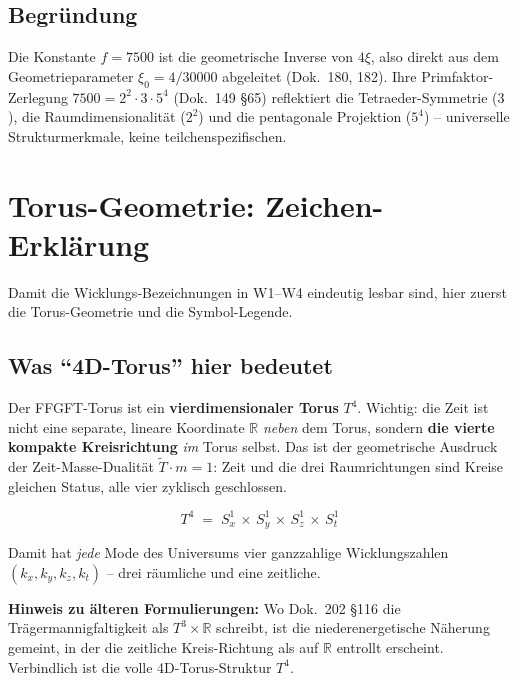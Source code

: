 \subsection*{Begründung}

Die Konstante $f = 7500$ ist die geometrische Inverse von $4\xi$,
also direkt aus dem Geometrieparameter $\xi_0 = 4/30000$ abgeleitet
(Dok.~180, 182). Ihre Primfaktor-Zerlegung
$7500 = 2^2 \cdot 3 \cdot 5^4$ (Dok.~149 §65) reflektiert die
Tetraeder-Symmetrie ($3$), die Raumdimensionalität ($2^2$) und die
pentagonale Projektion ($5^4$) -- universelle Strukturmerkmale, keine
teilchenspezifischen.

\section{Torus-Geometrie: Zeichen-Erklärung}

Damit die Wicklungs-Bezeichnungen in W1--W4 eindeutig lesbar sind,
hier zuerst die Torus-Geometrie und die Symbol-Legende.

\subsection*{Was \enquote{4D-Torus} hier bedeutet}

Der FFGFT-Torus ist ein \textbf{vierdimensionaler Torus} $T^4$.
Wichtig: die Zeit ist nicht eine separate, lineare Koordinate
$\mathbb{R}$ \emph{neben} dem Torus, sondern \textbf{die vierte
kompakte Kreisrichtung} \emph{im} Torus selbst. Das ist der
geometrische Ausdruck der Zeit-Masse-Dualität $\tilde T \cdot m = 1$:
Zeit und die drei Raumrichtungen sind Kreise gleichen Status, alle
vier zyklisch geschlossen.

\begin{equation}
  T^4 \;=\; S^1_x \,\times\, S^1_y \,\times\, S^1_z \,\times\, S^1_t
  \tag{210.0}
\end{equation}

Damit hat \emph{jede} Mode des Universums vier ganzzahlige
Wicklungszahlen $(k_x, k_y, k_z, k_t)$ -- drei räumliche und eine
zeitliche.

\textbf{Hinweis zu älteren Formulierungen:} Wo Dok.~202 §116 die
Trägermannigfaltigkeit als $T^3 \times \mathbb{R}$ schreibt, ist
die niederenergetische Näherung gemeint, in der die zeitliche
Kreis-Richtung als auf $\mathbb{R}$ entrollt erscheint. Verbindlich
ist die volle 4D-Torus-Struktur $T^4$.

